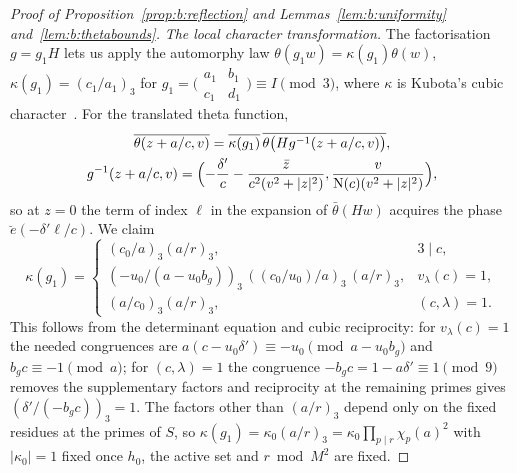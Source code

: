 \begin{proof}[Proof of Proposition~\ref{prop:b:reflection} and Lemmas~\ref{lem:b:uniformity} and~\ref{lem:b:thetabounds}]
\emph{The local character transformation.} The factorisation $g=g_1H$ lets us apply the automorphy law $\theta(g_1w)=\kappa(g_1)\theta(w)$, $\kappa(g_1)=(c_1/a_1)_3$ for $g_1=\bigl(\begin{smallmatrix}a_1&b_1\\c_1&d_1\end{smallmatrix}\bigr)\equiv I\pmod3$, where $\kappa$ is Kubota's cubic character~\cite[(5.4), (5.6)]{DR}. For the translated theta function,
\begin{equation}\label{eq:b:cuspautomorphy}
  \begin{gathered}
  \overline{\theta(z+a/c,v)}=\overline{\kappa(g_1)}\,\overline{\theta\bigl(Hg^{-1}(z+a/c,v)\bigr)},\\
  g^{-1}(z+a/c,v)=\Bigl(-\frac{\delta'}c-\frac{\bar z}{c^2(v^2+|z|^2)},\frac v{\mathrm{N}(c)(v^2+|z|^2)}\Bigr),
  \end{gathered}
\end{equation}
so at $z=0$ the term of index $\ell$ in the expansion of $\bar\theta(Hw)$ acquires the phase $\breve e(-\delta'\ell/c)$. We claim
\begin{equation}\label{eq:b:raymultiplier}
  \kappa(g_1)=\begin{cases}(c_0/a)_3(a/r)_3,&3\mid c,\\(-u_0/(a-u_0b_g))_3\,((c_0/u_0)/a)_3\,(a/r)_3,&v_\lambda(c)=1,\\(a/c_0)_3(a/r)_3,&(c,\lambda)=1.\end{cases}
\end{equation}
This follows from the determinant equation and cubic reciprocity: for $v_\lambda(c)=1$ the needed congruences are $a(c-u_0\delta')\equiv-u_0\pmod{a-u_0b_g}$ and $b_gc\equiv-1\pmod a$; for $(c,\lambda)=1$ the congruence $-b_gc=1-a\delta'\equiv1\pmod9$ removes the supplementary factors and reciprocity at the remaining primes gives $(\delta'/(-b_gc))_3=1$. The factors other than $(a/r)_3$ depend only on the fixed residues at the primes of $S$, so $\kappa(g_1)=\kappa_0(a/r)_3=\kappa_0\prod_{p\mid r}\chi_p(a)^2$ with $|\kappa_0|=1$ fixed once $h_0$, the active set and $r\bmod M^2$ are fixed.


\end{proof}
